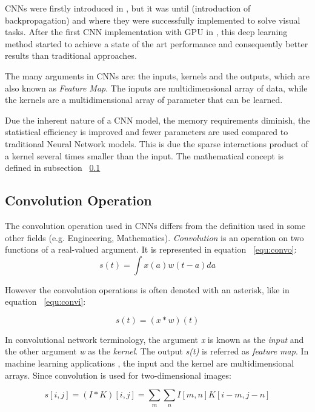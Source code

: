 CNNs were firstly introduced in \textcite{fukushima1980neocognitron}, but it was until \textcite{le1990handwritten} (introduction of backpropagation) and \textcite{lecun1998gradient} where they were successfully implemented to solve visual tasks.
After the first CNN implementation with GPU in  \textcite{ciresan2011flexible}, this deep learning method started to achieve a state of the art performance and consequently better results than traditional approaches. 

The many arguments in CNNs are: the inputs, kernels and the outputs, which are also known as \textit{Feature Map}. The inputs are multidimensional array of data, while the kernels are a multidimensional array of parameter that can be learned.

Due the inherent nature of a CNN model, the memory requirements diminish, the statistical efficiency is improved and fewer parameters are used compared to traditional Neural Network models. This is due the sparse interactions product of a kernel several times smaller than the input. The mathematical concept is defined in subsection ~\ref{subsec:convop}

\subsection{Convolution Operation}
\label{subsec:convop}
The convolution operation used in CNNs differs from the definition used in some other fields (e.g. Engineering, Mathematics). \textit{Convolution} is an operation on two functions of a real-valued argument. It is represented in equation ~\ref{equ:convo}:
%
\begin{equation}
 s(t) = \int x(a)w(t-a)da
 \label{equ:convo}
\end{equation}

However the convolution operations is often denoted with an asterisk, like in equation ~\ref{equ:convi}:

\begin{equation}
 s(t) = (x \ast w)(t)
 \label{equ:convi}
\end{equation}
 
In convolutional network terminology, the argument \textit{x} is known as the \textit{input} and the other argument \textit{w} as the \textit{kernel}. The output \textit{s(t)} is referred as \textit{feature map}.
In machine learning applications , the input and the kernel are multidimensional arrays.
Since convolution is used for two-dimensional images:

\begin{equation}
 s[i,j] = (I \ast K)[i,j] = \sum_{m} \sum_{n}I[m,n]K[i-m,j-n]
 \label{equ:convii}
\end{equation}

